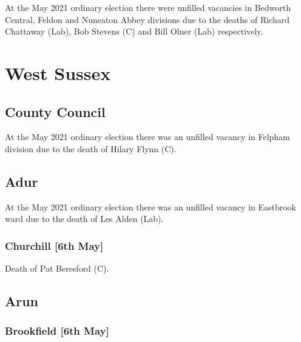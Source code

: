 \documentclass[a4paper,openany]{book}
\begin{document}
\begin{resultsiii}
At the May 2021 ordinary election there were unfilled vacancies in Bedworth Central, Feldon and Nuneaton Abbey divisions due to the deaths of Richard Chattaway (Lab), Bob Stevens (C) and Bill Olner (Lab) respectively.

\section{West Sussex}

\subsection*{County Council}

At the May 2021 ordinary election there was an unfilled vacancy in Felpham division due to the death of Hilary Flynn (C).

\subsection*{Adur}

At the May 2021 ordinary election there was an unfilled vacancy in Eastbrook ward due to the death of Les Alden (Lab).

\subsubsection*{Churchill \hspace*{\fill}\nolinebreak[1]%
	\enspace\hspace*{\fill}
	[6th May]}


Death of Pat Beresford (C).

\subsection*{Arun}

\subsubsection*{Brookfield \hspace*{\fill}\nolinebreak[1]%
	\enspace\hspace*{\fill}
	[6th May]}


\end{resultsiii}
\end{document}
